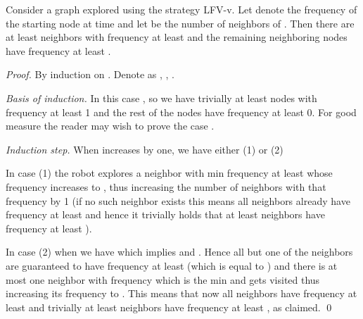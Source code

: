 \begin{lemma}
Consider a graph  explored using the
strategy LFV-v. Let  denote the frequency of the starting node  at time 
and let  be the number of neighbors of . Then there are at least 
neighbors with frequency at least  and the remaining
neighboring nodes have frequency at least .
\end{lemma}
\begin{proof}
By induction on . Denote as , ,
.

\noindent \emph{Basis of induction.}  In this case , so we have
trivially at least  nodes with frequency at least 1 and the rest of the nodes have frequency at least 0.
For good measure the reader may wish to prove the case .


\noindent \emph{Induction step.} When  increases by one, we have either (1) 
or (2) 

\noindent In case (1) the robot explores a neighbor with min frequency at
least  whose frequency increases to , thus increasing the
number of neighbors with that frequency by 1 (if no such neighbor
exists this means all neighbors already have frequency at least 
and hence it trivially holds that at least  neighbors have
frequency at least ).

\noindent In case (2) when  we have  which
implies  and . Hence all but one
of the neighbors are guaranteed to have frequency at least 
(which is equal to ) and there is at most one neighbor with frequency
 which is the min and gets visited thus increasing its frequency
to . This means that now all neighbors have frequency at least 
and trivially at least  neighbors have frequency at
least , as claimed.
\qed
\end{proof}

